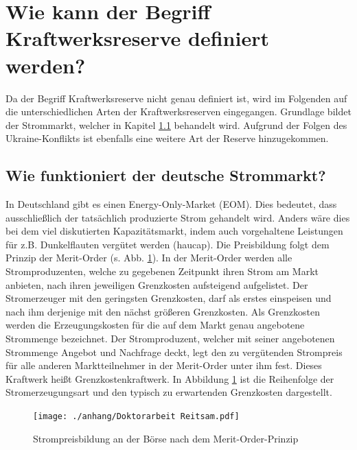 \section{Wie kann der Begriff Kraftwerksreserve definiert werden?}

	Da der Begriff Kraftwerksreserve nicht genau definiert ist, wird im Folgenden auf die unterschiedlichen Arten der Kraftwerksreserven eingegangen.
	Grundlage bildet der Strommarkt, welcher in Kapitel \ref{sect: Wie funktioniert der deutsche Strommarkt?} behandelt wird.
	Aufgrund der Folgen des Ukraine-Konflikts ist ebenfalls eine weitere Art der Reserve hinzugekommen.

	\subsection{Wie funktioniert der deutsche Strommarkt?} \label{sect: Wie funktioniert der deutsche Strommarkt?}
	
		In Deutschland gibt es einen Energy-Only-Market (EOM).
		Dies bedeutet, dass ausschließlich der tatsächlich produzierte Strom gehandelt wird.
		Anders wäre dies bei dem viel diskutierten Kapazitätsmarkt, indem auch vorgehaltene Leistungen für z.B. Dunkelflauten vergütet werden (haucap).
		Die Preisbildung folgt dem Prinzip der Merit-Order (s. Abb. \ref{Abb. Strompreisbildung Merit Order}).
		In der Merit-Order werden alle Stromproduzenten, welche zu gegebenen Zeitpunkt ihren Strom am Markt anbieten, nach ihren jeweiligen Grenzkosten aufsteigend aufgelistet.
		Der Stromerzeuger mit den geringsten Grenzkosten, darf als erstes einspeisen und nach ihm derjenige mit den nächst größeren Grenzkosten.
		Als Grenzkosten werden die Erzeugungskosten für die auf dem Markt genau angebotene Strommenge bezeichnet.
		Der Stromproduzent, welcher mit seiner angebotenen Strommenge Angebot und Nachfrage deckt, legt den zu vergütenden Strompreis für alle anderen Marktteilnehmer in der Merit-Order unter ihm fest.
		Dieses Kraftwerk heißt Grenzkostenkraftwerk.
		In Abbildung \ref{Abb. Strompreisbildung Merit Order} ist die Reihenfolge der Stromerzeugungsart und den typisch zu erwartenden Grenzkosten dargestellt. \\
		
		\begin{figure} [H]
			\centering
			\label{Abb. Strompreisbildung Merit Order}
			\texttt{[image: ./anhang/Doktorarbeit Reitsam.pdf]}
			\caption{Strompreisbildung an der Börse nach dem Merit-Order-Prinzip \parencite{Doktorarbeit_Reitsam}}
		\end{figure}
		
